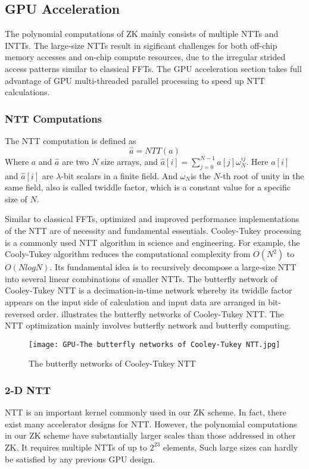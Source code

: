 \subsection{GPU Acceleration}\label{section: gpu-acceleration}
The polynomial computations of ZK mainly consists of multiple NTTs and INTTs. The large-size NTTs result in sigificant challenges for both off-chip memory accesses and on-chip compute resources, due to the irregular strided access patterns similar to classical FFTs. The GPU acceleration section takes full advantage of GPU multi-threaded parallel processing to speed up NTT calculations.
\subsubsection{NTT Computations}
The NTT computation is defined as
\[\hat{a} = NTT{(a)}\]
Where $a$ and  $\hat{a}$ are two $N$ size arrays, and  $\hat{a}[i] = \sum_{j=0}^{N-1} a[j] \omega_N^{ij}$. Here $a[i]$ and $\hat{a}[i]$ are $\lambda$-bit scalars in a finite field. And $\omega_N$is the $N$-th root of unity in the same field, also is called twiddle factor, which is a constant value for a specific size of $N$.

Similar to classical FFTs, optimized and improved performance implementations of the NTT are of necessity and fundamental essentials. Cooley-Tukey processing is a commonly used NTT algorithm in science and engineering. For example, the Cooly-Tukey algorithm reduces the computational complexity from $O(N^2)$ to $O(NlogN)$. Its fundamental idea is to recursively decompose a large-size NTT into several linear combinations of smaller NTTs. The butterfly network of Cooley-Tukey NTT is a decimation-in-time network whereby its twiddle factor appears on the input side of calculation and input data are arranged in bit-reversed order.  illustrates the butterfly networks of Cooley-Tukey NTT. The NTT optimization mainly involves butterfly network and butterfly computing.
\begin{figure}[!ht]
    \centering
    \texttt{[image: GPU-The butterfly networks of Cooley-Tukey NTT.jpg]}
    \caption{The butterfly networks of Cooley-Tukey NTT}
    \label{fig:The Butterfly Networks of Cooley-Tukey NTT}
\end{figure}
\subsubsection{2-D NTT}
NTT is an important kernel commonly used in our ZK scheme. In fact, there exist many accelerator designs for NTT. However, the polynomial computations in our ZK scheme have substantially larger scales than those addressed in other ZK. It requires multiple NTTs of up to $2^{23}$ elements, Such large sizes can hardly be satisfied by any previous GPU design.

